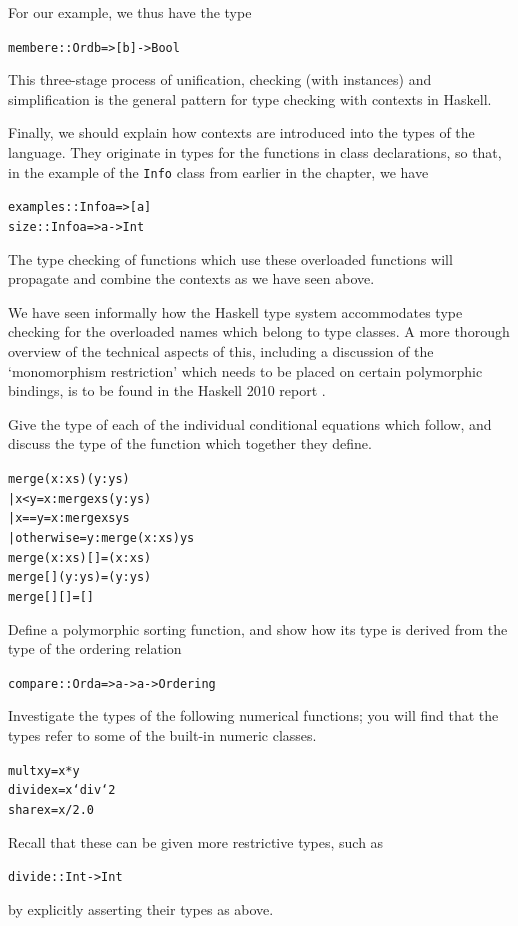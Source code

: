 For our example, we thus have the type
\begin{alltt}
member e :: Ord b => [b] -> Bool
\end{alltt}
This three-stage
process of unification, checking (with instances) and simplification is
the general pattern for type checking with contexts in Haskell. 

Finally, we should explain how contexts are introduced into the types of the
language. They originate in types for the functions in class declarations, so
that, in the example of the \texttt{Info} class from earlier in the chapter, we have
\begin{alltt}
examples :: Info a => [a]
size     :: Info a => a -> Int
\end{alltt}
The type checking of
functions which use these overloaded functions will propagate
and combine the contexts as we have seen above.

We have seen informally how the Haskell type system accommodates type
checking for the overloaded names which belong to type classes. A more
thorough overview of the technical aspects of this, including a
discussion of the `monomorphism restriction' which needs to be placed on
certain polymorphic bindings, is to be found in the Haskell 2010
report \cite{haskell2010}.


\begin{exercises}

\item
Give the type of each of the individual conditional
equations which follow, and discuss the
type of the function which together they define.
\begin{alltt}
merge (x:xs) (y:ys) 
  | x<y         = x : merge xs (y:ys)
  | x==y        = x : merge xs ys
  | otherwise   = y : merge (x:xs) ys
merge (x:xs) []    = (x:xs)
merge []    (y:ys) = (y:ys)
merge []    []     = []
\end{alltt}

\item
Define a polymorphic sorting function, and show how its type is derived from
the type of the ordering relation
\begin{alltt}
compare :: Ord a => a -> a -> Ordering
\end{alltt}

\item
Investigate the types of the following numerical functions; you will
find that the types refer to some of the built-in numeric classes.
\begin{alltt}
mult x y = x*y
divide x = x `div` 2
share x  = x / 2.0
\end{alltt}
Recall that these can be given more restrictive types, such as
\begin{alltt}
divide :: Int -> Int
\end{alltt}
by explicitly asserting their types as above.
\end{exercises}

